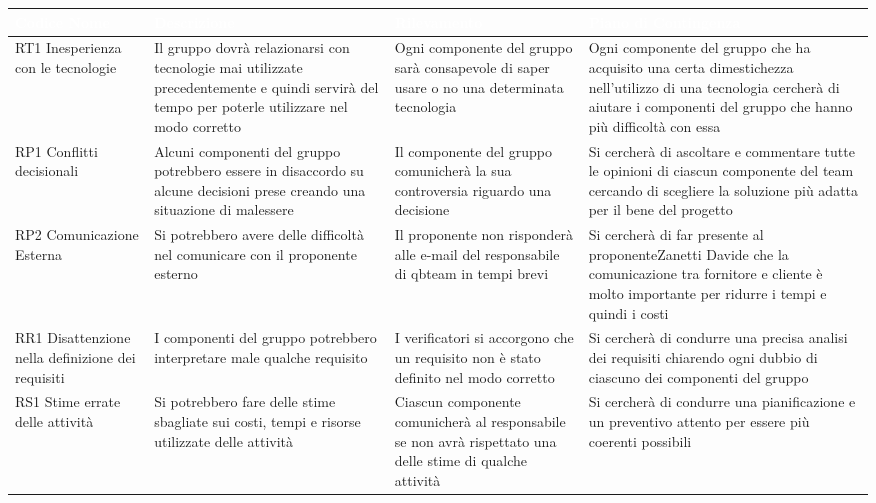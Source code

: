 {
\renewcommand{\arraystretch}{2}
\centering
\begin{longtable}{ C{2cm} C{4.5cm} C{4.5cm} C{4.5cm}}
	\textcolor{white}{\textbf{Codice Nome}} & 
	\textcolor{white}{\textbf{Descrizione}} & 
	\textcolor{white}{\textbf{Rilevamento}} &  
	\textcolor{white}{\textbf{Piano di Contingenza}}\\	
\endhead


RT1 Inesperienza con le tecnologie & Il gruppo dovrà relazionarsi con tecnologie mai utilizzate precedentemente e quindi servirà del tempo per poterle utilizzare nel modo corretto & Ogni componente del gruppo sarà consapevole di saper usare o no una determinata tecnologia & Ogni componente del gruppo che ha acquisito una certa dimestichezza nell'utilizzo di una tecnologia cercherà di aiutare i componenti del gruppo che hanno più difficoltà con essa \\

RP1 Conflitti decisionali & Alcuni componenti del gruppo potrebbero essere in disaccordo su alcune decisioni prese creando una situazione di malessere & Il componente del gruppo comunicherà la sua controversia riguardo una decisione  & Si cercherà di ascoltare e commentare tutte le opinioni di ciascun componente del team cercando di scegliere la soluzione più adatta per il bene del progetto \\ 

RP2 Comunicazione Esterna & Si potrebbero avere delle difficoltà nel comunicare con il proponente esterno & Il proponente non risponderà alle e-mail del responsabile di qbteam in tempi brevi & Si cercherà di far presente al proponenteZanetti Davide che la comunicazione tra fornitore e cliente è molto importante per ridurre i tempi e quindi i costi \\

RR1 Disattenzione nella definizione dei requisiti & I componenti del gruppo potrebbero interpretare male qualche requisito & I verificatori si accorgono che un requisito non è stato definito nel modo corretto & Si cercherà di condurre una precisa analisi dei requisiti chiarendo ogni dubbio di ciascuno dei componenti del gruppo \\

RS1 Stime errate delle attività & Si potrebbero fare delle stime sbagliate sui costi, tempi e risorse utilizzate delle attività & Ciascun componente comunicherà al responsabile se non avrà rispettato una delle stime di qualche attività & Si cercherà di condurre una pianificazione e un preventivo attento per essere più coerenti possibili \\



\end{longtable}}
